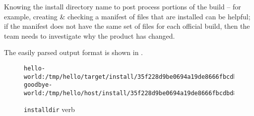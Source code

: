 Knowing the install directory name to post process portions of the
build -- for example, creating \& checking a manifest of files that
are installed can be helpful; if the manifest does not have the same
set of files for each official build, then the \bni team needs to
investigate why the product has changed.

The easily parsed output format is shown in
.

\begin{figure}[tbh]
\hrulefill
\begin{footnotesize}
\begin{verbatim}
hello-world:/tmp/hello/target/install/35f228d9be0694a19de8666fbcdbd80d
goodbye-world:/tmp/hello/host/install/35f228d9be0694a19de8666fbcdbd80d
\end{verbatim}
\end{footnotesize}
\hrulefill
\caption{\texttt{installdir} verb}\label{usinglmsbw:installdir-verb}
\end{figure}

